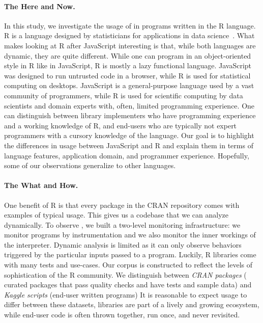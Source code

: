 \documentclass[acmsmall, screen]{acmart}
\begin{document}
\paragraph{The Here and Now.} In this study, we investigate the usage of \eval
in programs written in the R language. R is a language designed by statisticians
for applications in data science~\cite{r}. What makes looking at R after
JavaScript interesting is that, while both languages are dynamic, they are quite
different. While one can program in an object-oriented style in R like in
JavaScript, R is mostly a lazy functional language. JavaScript was designed to
run untrusted code in a browser, while R is used for statistical computing on
desktops. JavaScript is a general-purpose language used by a vast community of
programmers, while R is used for scientific computing by data scientists and
domain experts with, often, limited programming experience. One can distinguish
between library implementers who have programming experience and a working
knowledge of R, and end-users who are typically not expert programmers with a
cursory knowledge of the language. Our goal is to highlight the
differences in usage between JavaScript and R and explain them in terms of
language features, application domain, and programmer experience. Hopefully,
some of our observations generalize to other languages.

\paragraph{The What and How.} One benefit of
R is that every package in the CRAN repository comes with examples of typical
usage. This gives us a codebase that we can analyze dynamically. To observe
\eval, we built a two-level monitoring infrastructure: we monitor programs by
instrumentation and we also monitor the inner workings of the interpreter.
Dynamic analysis is limited as it can only observe behaviors triggered by the
particular inputs passed to a program. Luckily, R libraries come with many tests
and use-cases. Our corpus is constructed to reflect the levels of sophistication
of the R community. We distinguish between \emph{CRAN packages} (\CranPackages
curated packages that pass quality checks and have tests and sample data) and
\emph{Kaggle scripts} (\KaggleUnique end-user written programs) It is reasonable
to expect \eval usage to differ between these datasets, libraries are part of a
lively and growing ecosystem, while end-user code is often thrown together, run
once, and never revisited.
\end{document}
